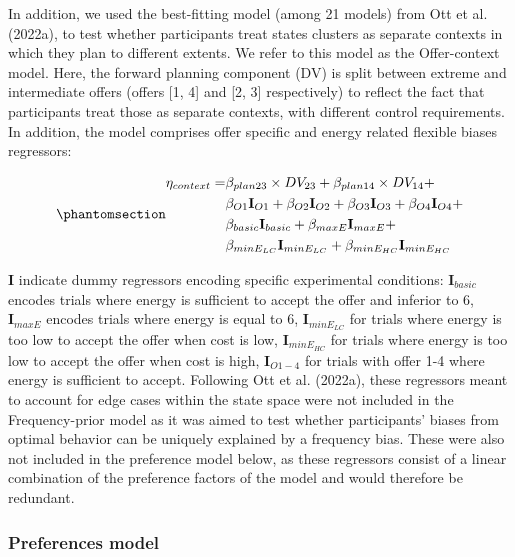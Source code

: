 \documentclass[
  letterpaper,
  DIV=11,
  numbers=noendperiod]{scrartcl}
\begin{document}
In addition, we used the best-fitting model (among 21 models) from Ott
et al. (2022a), to test whether participants treat states clusters as
separate contexts in which they plan to different extents. We refer to
this model as the Offer-context model. Here, the forward planning
component (DV) is split between extreme and intermediate offers (offers
{[}1, 4{]} and {[}2, 3{]} respectively) to reflect the fact that
participants treat those as separate contexts, with different control
requirements. In addition, the model comprises offer specific and energy
related flexible biases regressors:

\begin{equation}\protect\phantomsection\label{eq-context-model}{
\begin{aligned}
\eta_{context} =& \beta_{plan23} \times DV_{23} + \beta_{plan14} \times DV_{14} + \\
&\beta_{O1}\mathbf{I}_{O1} + \beta_{O2}\mathbf{I}_{O2} + \beta_{O3}\mathbf{I}_{O3} + \beta_{O4}\mathbf{I}_{O4} + \\
&\beta_{basic}\mathbf{I}_{basic} + \beta_{maxE}\mathbf{I}_{maxE} + \\
&\beta_{minE_{LC}}\mathbf{I}_{minE_{LC}} + \beta_{minE_{HC}}\mathbf{I}_{minE_{HC}} 
\end{aligned}
}\end{equation}

\(\mathbf{I}\) indicate dummy regressors encoding specific experimental
conditions: \(\mathbf{I}_{basic}\) encodes trials where energy is
sufficient to accept the offer and inferior to 6, \(\mathbf{I}_{maxE}\)
encodes trials where energy is equal to 6, \(\mathbf{I}_{minE_{LC}}\)
for trials where energy is too low to accept the offer when cost is low,
\(\mathbf{I}_{minE_{HC}}\) for trials where energy is too low to accept
the offer when cost is high, \(\mathbf{I}_{O1-4}\) for trials with offer
1-4 where energy is sufficient to accept. Following Ott et al. (2022a),
these regressors meant to account for edge cases within the state space
were not included in the Frequency-prior model as it was aimed to test
whether participants' biases from optimal behavior can be uniquely
explained by a frequency bias. These were also not included in the
preference model below, as these regressors consist of a linear
combination of the preference factors of the model and would therefore
be redundant.

\subsubsection{Preferences model}\label{preferences-model}
\end{document}
